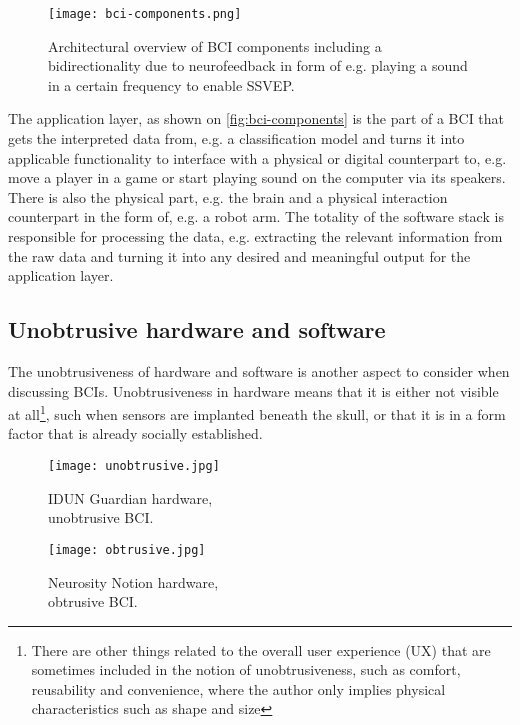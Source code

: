 \begin{figure}[ht]
  \centering
  \texttt{[image: bci-components.png]}
  \caption{Architectural overview of BCI components including a bidirectionality due to neurofeedback in form of e.g. playing a sound in a certain frequency to enable SSVEP.}
  \label{fig:bci-components}
\end{figure}

 The application layer, as shown on \autoref{fig:bci-components} is the part of a BCI that gets the interpreted data from, e.g. a classification model and turns it into applicable functionality to interface with a physical or digital counterpart to, e.g. move a player in a game or start playing sound on the computer via its speakers. There is also the physical part, e.g. the brain and a physical interaction counterpart in the form of, e.g. a robot arm. The totality of the software stack is responsible for processing the data, e.g. extracting the relevant information from the raw data and turning it into any desired and meaningful output for the application layer.

\subsection{Unobtrusive hardware and software}
\label{chapter2-unobtrusive-hardware-and-software}

The unobtrusiveness of hardware and software is another aspect to consider when discussing BCIs. Unobtrusiveness in hardware means that it is either not visible at all\footnote{There are other things related to the overall user experience (UX) that are sometimes included in the notion of unobtrusiveness, such as comfort, reusability and convenience, where the author only implies physical characteristics such as shape and size}, such when sensors are implanted beneath the skull, or that it is in a form factor that is already socially established.

\begin{figure}[!ht]
  \texttt{[image: unobtrusive.jpg]}
  \caption{IDUN Guardian hardware, \\ unobtrusive BCI.}
  \label{fig:unobstrusive-hardware}
  \endminipage\hfill
  \texttt{[image: obtrusive.jpg]}
  \caption{Neurosity Notion hardware, \\ obtrusive BCI.}
  \label{fig:obstrusive-hardware}
  \endminipage\hfill
\end{figure}

